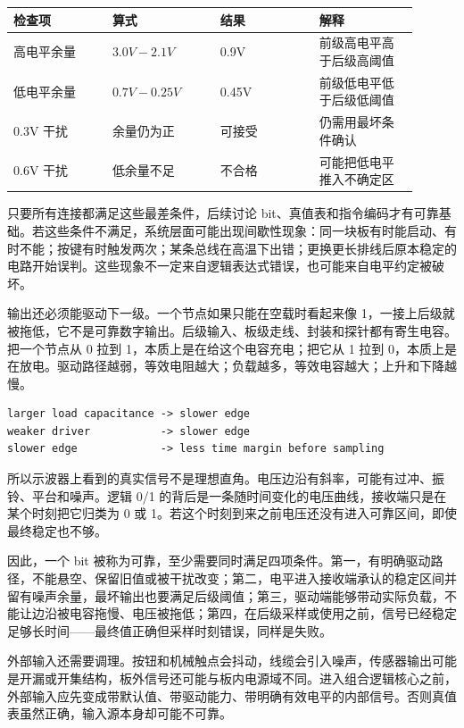 \begin{longtable}{L{0.22\linewidth}L{0.24\linewidth}L{0.22\linewidth}L{0.22\linewidth}}
\toprule
检查项 & 算式 & 结果 & 解释 \\
\midrule
高电平余量 & $3.0V-2.1V$ & 0.9V & 前级高电平高于后级高阈值 \\\tablerowrule
低电平余量 & $0.7V-0.25V$ & 0.45V & 前级低电平低于后级低阈值 \\\tablerowrule
0.3V 干扰 & 余量仍为正 & 可接受 & 仍需用最坏条件确认 \\\tablerowrule
0.6V 干扰 & 低余量不足 & 不合格 & 可能把低电平推入不确定区 \\
\bottomrule
\end{longtable}

只要所有连接都满足这些最差条件，后续讨论 bit、真值表和指令编码才有可靠基础。若这些条件不满足，系统层面可能出现间歇性现象：同一块板有时能启动、有时不能；按键有时触发两次；某条总线在高温下出错；更换更长排线后原本稳定的电路开始误判。这些现象不一定来自逻辑表达式错误，也可能来自电平约定被破坏。

输出还必须能驱动下一级。一个节点如果只能在空载时看起来像 1，一接上后级就被拖低，它不是可靠数字输出。后级输入、板级走线、封装和探针都有寄生电容。把一个节点从 0 拉到 1，本质上是在给这个电容充电；把它从 1 拉到 0，本质上是在放电。驱动路径越弱，等效电阻越大；负载越多，等效电容越大；上升和下降越慢。

\begin{lstlisting}
larger load capacitance -> slower edge
weaker driver           -> slower edge
slower edge             -> less time margin before sampling
\end{lstlisting}

所以示波器上看到的真实信号不是理想直角。电压边沿有斜率，可能有过冲、振铃、平台和噪声。逻辑 0/1 的背后是一条随时间变化的电压曲线，接收端只是在某个时刻把它归类为 0 或 1。若这个时刻到来之前电压还没有进入可靠区间，即使最终稳定也不够。

因此，一个 bit 被称为可靠，至少需要同时满足四项条件。第一，有明确驱动路径，不能悬空、保留旧值或被干扰改变；第二，电平进入接收端承认的稳定区间并留有噪声余量，最坏输出也要满足后级阈值；第三，驱动端能够带动实际负载，不能让边沿被电容拖慢、电压被拖低；第四，在后级采样或使用之前，信号已经稳定足够长时间——最终值正确但采样时刻错误，同样是失败。

外部输入还需要调理。按钮和机械触点会抖动，线缆会引入噪声，传感器输出可能是开漏或开集结构，板外信号还可能与板内电源域不同。进入组合逻辑核心之前，外部输入应先变成带默认值、带驱动能力、带明确有效电平的内部信号。否则真值表虽然正确，输入源本身却可能不可靠。

